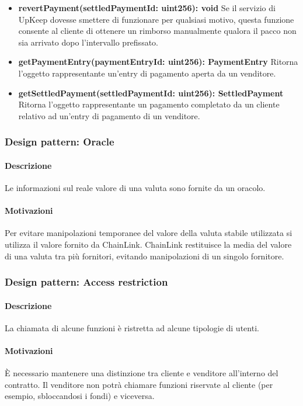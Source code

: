\documentclass[a4paper, 12pt]{article}
\begin{document}
\begin{itemize}
    \item \textbf{revertPayment(settledPaymentId: uint256): void}
    Se il servizio di UpKeep dovesse smettere di funzionare per qualsiasi motivo, questa funzione consente al cliente di ottenere un rimborso manualmente qualora il pacco non sia arrivato dopo l'intervallo prefissato.\\
    \item \textbf{getPaymentEntry(paymentEntryId: uint256): PaymentEntry}
    Ritorna l'oggetto rappresentante un'entry di pagamento aperta da un venditore.\\
    \item \textbf{getSettledPayment(settledPaymentId: uint256): SettledPayment}
    Ritorna l'oggetto rappresentante un pagamento completato da un cliente relativo ad un'entry di pagamento di un venditore.\\

\end{itemize}
\subsubsection{Design pattern: Oracle}
\paragraph{Descrizione}
Le informazioni sul reale valore di una valuta sono fornite da un oracolo.
\paragraph{Motivazioni}
Per evitare manipolazioni temporanee del valore della valuta stabile utilizzata si utilizza il valore fornito da ChainLink.
ChainLink restituisce la media del valore di una valuta tra più fornitori, evitando manipolazioni di un singolo fornitore.
\subsubsection{Design pattern: Access restriction}
\paragraph{Descrizione}
La chiamata di alcune funzioni è ristretta ad alcune tipologie di utenti.
\paragraph{Motivazioni}
È necessario mantenere una distinzione tra cliente e venditore all'interno del contratto.
Il venditore non potrà chiamare funzioni riservate al cliente (per esempio, sbloccandosi i fondi) e viceversa.
\end{document}
